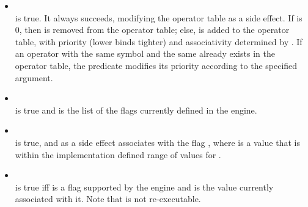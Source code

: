 \begin{itemize}
%
\item {}\\
\noindent{} is true. It always succeeds,
modifying the operator table as a side effect. If  is 0, then
 is removed from the operator table; else,  is
added to the operator table, with priority (lower binds tighter) 
and associativity determined by . If an operator with the same
 symbol and the same  already exists in the operator
table, the predicate modifies its priority according to the specified 
argument.\\
\noindent{}
%
%
 \item {}\\
 \noindent{} is true and  is
 the list of the flags currently defined in the engine.\\
 \noindent{}
%
\item {}\\
\noindent{} is true, and as a side
effect associates  with the flag , where
 is a value that is within the implementation defined
range of values for .\\
\noindent{}
%
\item {}\\
\noindent{} is true iff 
is a flag supported by the engine and  is the value
currently associated with it. Note that  is
not re-executable.\\
\noindent{}
%
\end{itemize}

